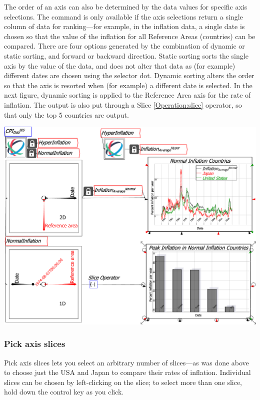 The order of an axis can also be determined by the data values for
specific axis selections. The command is only available if the axis
selections return a single column of data for ranking---for example,
in the inflation data, a single date is chosen so that the value of
the inflation for all Reference Areas (countries) can be compared.
There are four options generated by the combination of dynamic or
static sorting, and forward or backward direction. Static sorting
sorts the single axis by the value of the data, and does not alter
that data as (for example) different dates are chosen using the selector
dot. Dynamic sorting alters the order so that the axis is resorted
when (for example) a different date is selected. In the next figure,
dynamic sorting is applied to the Reference Area axis for the rate
of inflation. The output is also put through a Slice \ref{Operation:slice}
operator, so that only the top 5 countries are output.

\includegraphics[width=15cm]{images/CPI_SubsetsDynamicSorting}

\subsubsection{Pick axis slices}

Pick axis slices lets you select an arbitrary number of slices---as
was done above to choose just the USA and Japan to compare their rates
of inflation. Individual slices can be chosen by left-clicking on
the slice; to select more than one slice, hold down the control key
as you click.


